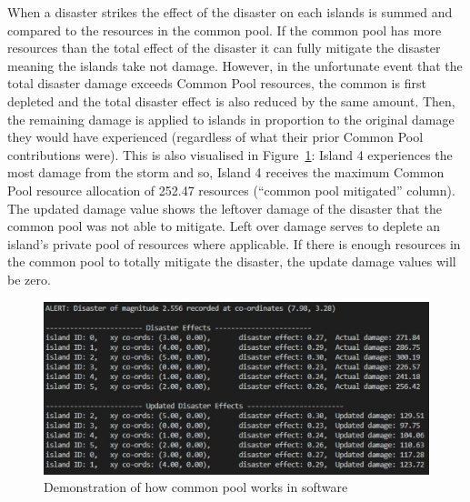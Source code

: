 When a disaster strikes the effect of the disaster on each islands is summed and compared to the resources in the common pool. If the common pool has more resources than the total effect of the disaster it can fully mitigate the disaster meaning the islands take not damage. However, in the unfortunate event that the total disaster damage exceeds Common Pool resources, the common is first depleted and the total disaster effect is also reduced by the same amount. Then, the remaining damage is applied to islands in proportion to the original damage they would have experienced (regardless of what their prior Common Pool contributions were). This is also visualised in Figure~\ref{fig:Common Pool infrastructure outcome}: Island 4 experiences the most damage from the storm and so, Island 4 receives the maximum Common Pool resource allocation of 252.47 resources (“common pool mitigated” column). The updated damage value shows the leftover damage of the disaster that the common pool was not able to mitigate. Left over damage serves to deplete an island's private pool of resources where applicable. If there is enough resources in the common pool to totally mitigate the disaster, the update damage values will be zero.

\begin{figure}[!htb]
    \centering
    \includegraphics[width=1\textwidth]{04_environment/images/Common Pool infrastructure outcome.PNG}
    \caption{Demonstration of how common pool works in software}
    \label{fig:Common Pool infrastructure outcome}
\end{figure}

